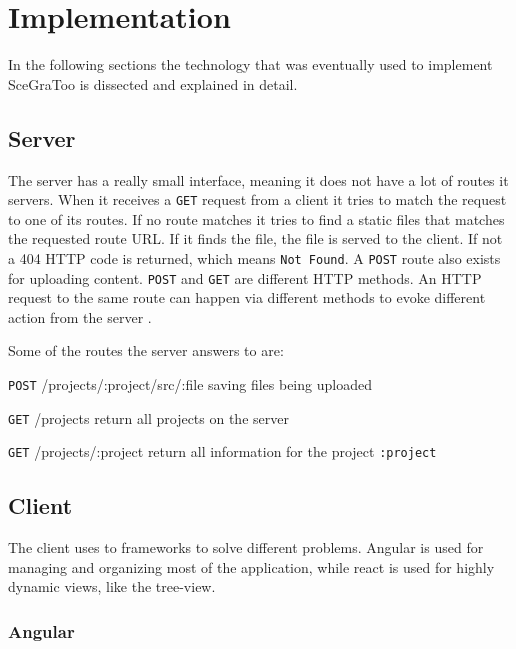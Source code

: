 
\section{Implementation}
\label{implementation}

In the following sections the technology that was eventually used to implement \gls{SceGraToo} is dissected and explained in detail.

\subsection{Server}

The server has a really small interface, meaning it does not have a lot of routes it servers.
When it receives a \texttt{GET} request from a client it tries to match the request to one of its routes.
If no route matches it tries to find a static files that matches the requested route URL.
If it finds the file, the file is served to the client.
If not a 404 HTTP code is returned, which means \texttt{Not Found}.
A \texttt{POST} route also exists for uploading content.
\texttt{POST} and \texttt{GET} are different HTTP methods.
An HTTP request to the same route can happen via different methods to evoke different action from the server \cite{httpmethods}.

Some of the routes the server answers to are:

\begin{description*}
  \item[\texttt{POST} /projects/:project/src/:file]
    saving files being uploaded
  \item[\texttt{GET} /projects]
    return all projects on the server
  \item[\texttt{GET} /projects/:project]
    return all information for the project \texttt{:project}
\end{description*}

\subsection{Client}

The client uses to frameworks to solve different problems.
Angular is used for managing and organizing most of the application, while react is used for highly dynamic views, like the tree-view.

\subsubsection{Angular}
\label{angular}

